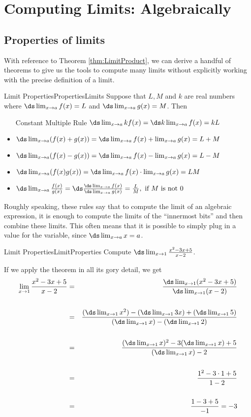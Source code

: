 \section{Computing Limits: Algebraically}\label{sec:ComputingLimitsAlg}
\subsection*{Properties of limits}
With reference to Theorem \ref{thm:LimitProduct}, we can derive 
a handful of theorems to give us the tools to compute many limits
without explicitly working with the precise definition of a limit.

\begin{theorem}{Limit Properties}{PropertiesLimits}
 Suppose that $ L, M $ and $ k $ are real numbers where  $\ds \lim_{x\to a}f(x)=L$ and $\ds \lim_{x\to a}g(x)=M$. Then
\begin{itemize}
\item[Constant Multiple Rule] $\ds\lim_{x\to a} kf(x) =\ds k\lim_{x\to a}f(x)=kL$
\item $\ds\lim_{x\to a} (f(x)+g(x)) = \ds\lim_{x\to a}f(x)+\lim_{x\to a}g(x)=L+M$
\item $\ds\lim_{x\to a} (f(x)-g(x)) = \ds\lim_{x\to a}f(x)-\lim_{x\to a}g(x)=L-M$
\item $\ds\lim_{x\to a} (f(x)g(x)) = \ds\lim_{x\to a}f(x)\cdot\lim_{x\to a}g(x)=LM$
\item $\ds\lim_{x\to a} \frac{f(x)}{g(x)} = \ds\frac{\ds\lim_{x\to a}f(x)}{\ds\lim_{x\to a}g(x)}=\frac{L}{M},\hbox{ if $M$ is not 0}$
\end{itemize}
\end{theorem}

Roughly speaking, these rules say that to compute the limit of an
algebraic expression, it is enough to compute the limits of the
``innermost bits'' and then combine these limits. This often means
that it is possible to simply plug in a value for the variable, since
$\ds \lim_{x\to a} x =a$.

\begin{example}{Limit Properties}{LimitProperties}
Compute $\ds\lim_{x\to 1}{x^2-3x+5\over x-2}$.
\end{example}

\begin{solution} 
 If we apply the theorem in all its gory detail, we get
\begin{eqnarray*}
\lim_{x\to 1}{x^2-3x+5\over x-2}&=&
{\ds\lim_{x\to 1}(x^2-3x+5)\over \ds\lim_{x\to1}(x-2)}\cr
\\
&=&{(\ds\lim_{x\to 1}x^2)-(\ds\lim_{x\to1}3x)+(\ds\lim_{x\to1}5)\over 
  (\ds\lim_{x\to1}x)-(\ds\lim_{x\to1}2)}\cr
\\
&=&{(\ds\lim_{x\to 1}x)^2-3(\ds\lim_{x\to1}x)+5\over (\ds\lim_{x\to1}x)-2}\cr
\\
&=&{1^2-3\cdot1+5\over 1-2}\cr
\\
&=&{1-3+5\over -1} = -3
\end{eqnarray*}
\end{solution}
 
